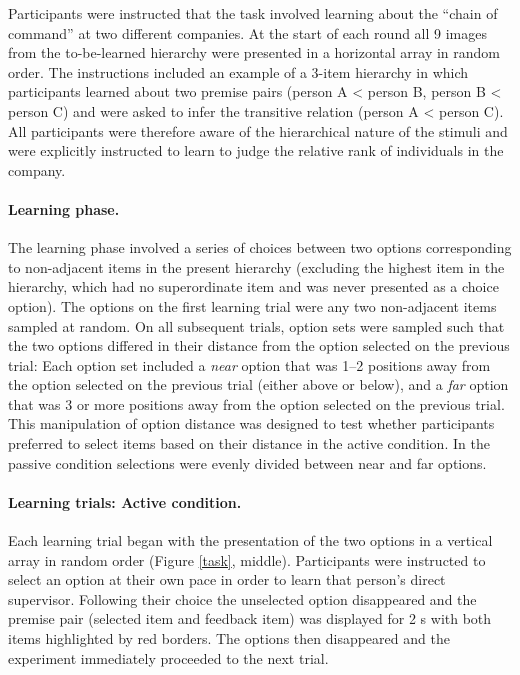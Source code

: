 \documentclass[floatsintext,man]{apa6}
\theoremstyle{definition}
\theoremstyle{definition}
\theoremstyle{definition}
\theoremstyle{remark}
\begin{document}
Participants were instructed that the task involved learning about the
\enquote{chain of command} at two different companies. At the start of
each round all 9 images from the to-be-learned hierarchy were presented
in a horizontal array in random order. The instructions included an
example of a 3-item hierarchy in which participants learned about two
premise pairs (person A \textless{} person B, person B \textless{}
person C) and were asked to infer the transitive relation (person A
\textless{} person C). All participants were therefore aware of the
hierarchical nature of the stimuli and were explicitly instructed to
learn to judge the relative rank of individuals in the company.

\paragraph{Learning phase.}\label{learning-phase.}

The learning phase involved a series of choices between two options
corresponding to non-adjacent items in the present hierarchy (excluding
the highest item in the hierarchy, which had no superordinate item and
was never presented as a choice option). The options on the first
learning trial were any two non-adjacent items sampled at random. On all
subsequent trials, option sets were sampled such that the two options
differed in their distance from the option selected on the previous
trial: Each option set included a \emph{near} option that was 1--2
positions away from the option selected on the previous trial (either
above or below), and a \emph{far} option that was 3 or more positions
away from the option selected on the previous trial. This manipulation
of option distance was designed to test whether participants preferred
to select items based on their distance in the active condition. In the
passive condition selections were evenly divided between near and far
options.

\paragraph{Learning trials: Active
condition.}\label{learning-trials-active-condition.}

Each learning trial began with the presentation of the two options in a
vertical array in random order (Figure \ref{task}, middle). Participants
were instructed to select an option at their own pace in order to learn
that person's direct supervisor. Following their choice the unselected
option disappeared and the premise pair (selected item and feedback
item) was displayed for 2 s with both items highlighted by red borders.
The options then disappeared and the experiment immediately proceeded to
the next trial.
\end{document}
